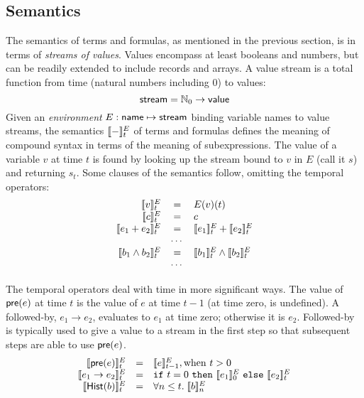 \subsection{Semantics}
The semantics of terms and formulas, as mentioned in the previous
section, is in terms of \emph{streams of values}. Values encompass at
least booleans and numbers, but can be readily extended to include
records and arrays. A value stream is a total function from time
(natural numbers including 0) to values:
\[
 \mathsf{stream} = \mathbb{N}_0 \to \mathsf{value}
\]
Given an \emph{environment} $E : \mathsf{name} \mapsto \mathsf{stream}$
binding variable names to value streams, the semantics $[\![ - ]\!]^E_t$
of terms and formulas defines the meaning of compound syntax in terms
of the meaning of subexpressions. The value of a variable $v$ at time
$t$ is found by looking up the stream bound to $v$ in $E$ (call it
$s$) and returning $s_t$. Some clauses of the semantics follow,
omitting the temporal operators:
\[
\begin{array}{rcl}
\sem{v}^E_t & = & E(v)(t) \\
\sem{c}^E_t & = & c \\
\sem{e_1 + e_2}^E_t & = & \sem{e_1}^E_t + \sem{e_2}^E_t \\
   & \cdots & \\
\sem{b_1 \land b_2}^E_t & = & \sem{b_1}^E_t \land \sem{b_2}^E_t \\
   & \cdots & \\
\end{array}
\]

The temporal operators deal with time in more significant ways. The
value of $\mathsf{pre}(e)$ at time $t$ is the value of $e$ at time
$t-1$ (at time zero,  is undefined).  A followed-by, $e_1
\to e_2$, evaluates to $e_1$ at time zero; otherwise it is $e_2$.
Followed-by is typically used to give a value to a stream in the first
step so that subsequent steps are able to use $\mathsf{pre}(e)$.
\[
\begin{array}{rcl}
\sem{\konst{pre}(e)}^E_t & = & \sem{e}^E_{t-1}, \mathrm{when}\ t > 0 \\
\sem{e_1 \to e_2}^E_t & = & \itelse{t=0}{\sem{e_1}^E_0}{\sem{e_2}^E_t} \\
\sem{\konst{Hist}(b)}^E_t & = & \forall n \leq t.\; \sem{b}^E_n
\end{array}
\]

